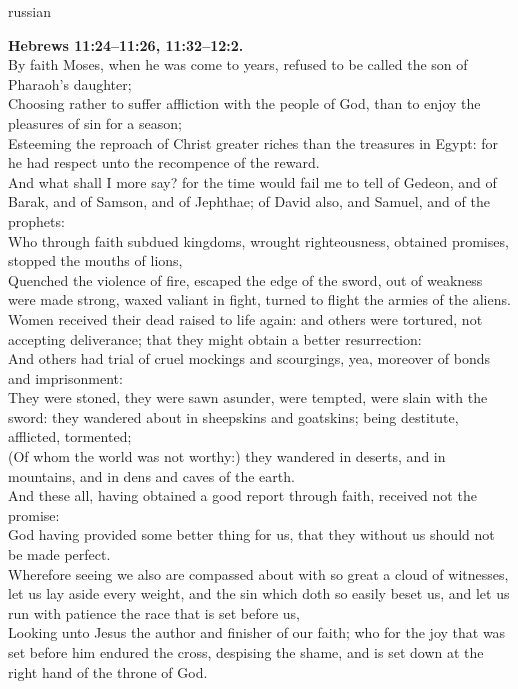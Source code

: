 \documentclass[10pt]{article} %
\begin{document}
{\begin{minipage}[t]{0.48\textwidth}
\begin{otherlanguage*}{russian}
\end{otherlanguage*}
\end{minipage}
\hfill
\begin{minipage}[t]{0.45\textwidth}

\textbf{Hebrews 11:24--11:26, 11:32--12:2.}\\
By faith Moses, when he was come to years, refused to be called the son of Pharaoh's daughter;\\
Choosing rather to suffer affliction with the people of God, than to enjoy the pleasures of sin for a season;\\
Esteeming the reproach of Christ greater riches than the treasures in Egypt: for he had respect unto the recompence of the reward.\\
And what shall I more say? for the time would fail me to tell of Gedeon, and of Barak, and of Samson, and of Jephthae; of David also, and Samuel, and of the prophets:\\
Who through faith subdued kingdoms, wrought righteousness, obtained promises, stopped the mouths of lions,\\
Quenched the violence of fire, escaped the edge of the sword, out of weakness were made strong, waxed valiant in fight, turned to flight the armies of the aliens.\\
Women received their dead raised to life again: and others were tortured, not accepting deliverance; that they might obtain a better resurrection:\\
And others had trial of cruel mockings and scourgings, yea, moreover of bonds and imprisonment:\\
They were stoned, they were sawn asunder, were tempted, were slain with the sword: they wandered about in sheepskins and goatskins; being destitute, afflicted, tormented;\\
(Of whom the world was not worthy:) they wandered in deserts, and in mountains, and in dens and caves of the earth.\\
And these all, having obtained a good report through faith, received not the promise:\\
God having provided some better thing for us, that they without us should not be made perfect.\\
Wherefore seeing we also are compassed about with so great a cloud of witnesses, let us lay aside every weight, and the sin which doth so easily beset us, and let us run with patience the race that is set before us,\\
Looking unto Jesus the author and finisher of our faith; who for the joy that was set before him endured the cross, despising the shame, and is set down at the right hand of the throne of God.\\

\end{minipage}}
\end{document}

